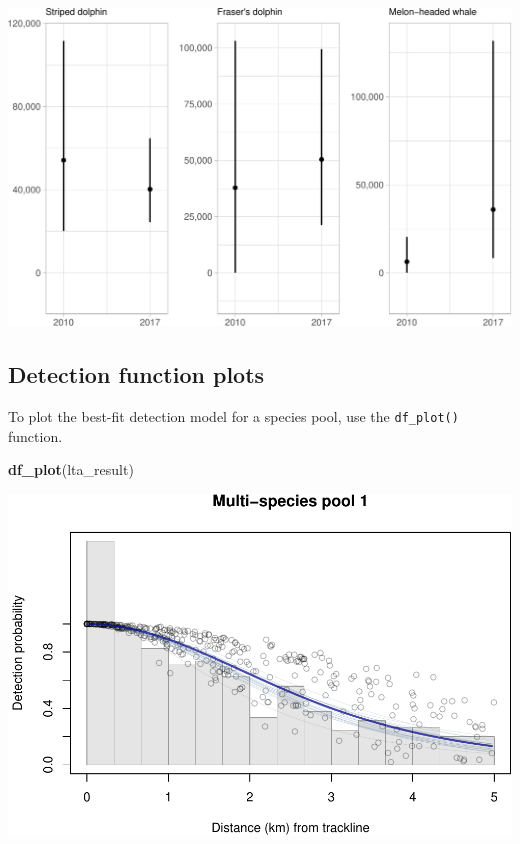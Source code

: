 \documentclass[
]{book}
\newenvironment{Shaded}{\begin{snugshade}}{\end{snugshade}}
\newcommand{\DataTypeTok}[1]{\textcolor[rgb]{0.13,0.29,0.53}{#1}}
\newcommand{\DecValTok}[1]{\textcolor[rgb]{0.00,0.00,0.81}{#1}}
\newcommand{\KeywordTok}[1]{\textcolor[rgb]{0.13,0.29,0.53}{\textbf{#1}}}
\newcommand{\NormalTok}[1]{#1}
\newcommand{\OperatorTok}[1]{\textcolor[rgb]{0.81,0.36,0.00}{\textbf{#1}}}
\newcommand{\StringTok}[1]{\textcolor[rgb]{0.31,0.60,0.02}{#1}}
\begin{document}
\begin{Shaded}
\end{Shaded}

\includegraphics{figures/unnamed-chunk-255-1.pdf}

\hypertarget{detection-function-plots}{%
\subsection*{Detection function plots}\label{detection-function-plots}}

To plot the best-fit detection model for a species pool, use the \texttt{df\_plot()} function.

\begin{Shaded}
\begin{Highlighting}[]
\KeywordTok{df_plot}\NormalTok{(lta_result)}
\end{Highlighting}
\end{Shaded}

\includegraphics{figures/unnamed-chunk-256-1.pdf}
\end{document}
